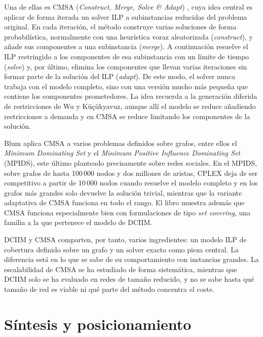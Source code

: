 \documentclass[12pt,twoside,titlepage]{report}
\begin{document}
Una de ellas es CMSA (\textit{Construct, Merge, Solve \& Adapt}) \cite{blum2024cmsa}, cuya idea central es aplicar de forma iterada un solver ILP a subinstancias reducidas del problema original.
En cada iteración, el método construye varias soluciones de forma probabilística, normalmente con una heurística voraz aleatorizada (\textit{construct}), y añade sus componentes a una subinstancia (\textit{merge}).
A continuación resuelve el ILP restringido a los componentes de esa subinstancia con un límite de tiempo (\textit{solve}) y, por último, elimina los componentes que llevan varias iteraciones sin formar parte de la solución del ILP (\textit{adapt}).
De este modo, el solver nunca trabaja con el modelo completo, sino con una versión mucho más pequeña que contiene los componentes prometedores.
La idea recuerda a la generación diferida de restricciones de Wu y Küçükyavuz, aunque allí el modelo se reduce añadiendo restricciones a demanda y en CMSA se reduce limitando los componentes de la solución.

Blum \cite{blum2024cmsa} aplica CMSA a varios problemas definidos sobre grafos, entre ellos el \textit{Minimum Dominating Set} y el \textit{Minimum Positive Influence Dominating Set} (MPIDS), este último planteado precisamente sobre redes sociales.
En el MPIDS, sobre grafos de hasta 100\,000 nodos y dos millones de aristas, CPLEX deja de ser competitivo a partir de 10\,000 nodos cuando resuelve el modelo completo y en los grafos más grandes solo devuelve la solución trivial, mientras que la variante adaptativa de CMSA funciona en todo el rango.
El libro muestra además que CMSA funciona especialmente bien con formulaciones de tipo \textit{set covering}, una familia a la que pertenece el modelo de DCIIM.

DCIIM y CMSA comparten, por tanto, varios ingredientes: un modelo ILP de cobertura definido sobre un grafo y un solver exacto como pieza central.
La diferencia está en lo que se sabe de su comportamiento con instancias grandes.
La escalabilidad de CMSA se ha estudiado de forma sistemática, mientras que DCIIM solo se ha evaluado en redes de tamaño reducido, y no se sabe hasta qué tamaño de red es viable ni qué parte del método concentra el coste.

\section{Síntesis y posicionamiento} \label{sec:lit_sintesis}

\end{document}
